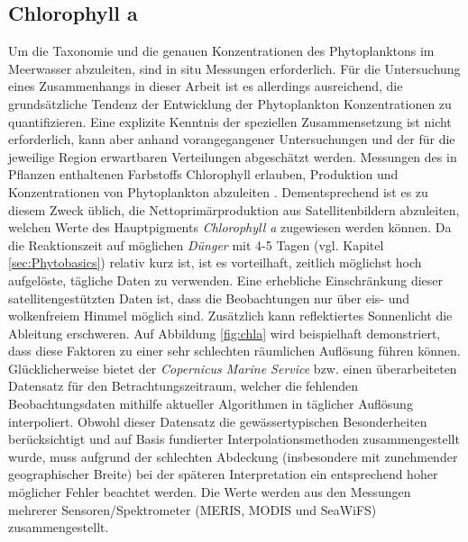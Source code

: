 \documentclass[12pt,a4paper,onecolumn]{scrartcl}
\begin{document}
\subsection{Chlorophyll a} \label{sec:chla}
Um die Taxonomie und die genauen Konzentrationen des Phytoplanktons im Meerwasser abzuleiten, sind in situ Messungen erforderlich. Für die Untersuchung eines Zusammenhangs in dieser Arbeit ist es allerdings ausreichend, die grundsätzliche Tendenz der Entwicklung der Phytoplankton Konzentrationen zu quantifizieren. Eine explizite Kenntnis der speziellen Zusammensetzung ist nicht erforderlich, kann aber anhand vorangegangener Untersuchungen und der für die jeweilige Region erwartbaren Verteilungen abgeschätzt werden. Messungen des in Pflanzen enthaltenen Farbstoffs Chlorophyll erlauben, Produktion und Konzentrationen von Phytoplankton abzuleiten \citep{RYTHER.1957}. Dementsprechend ist es zu diesem Zweck üblich, die Nettoprimärproduktion aus Satellitenbildern abzuleiten, welchen Werte des Hauptpigments \textit{Chlorophyll a} zugewiesen werden können. Da die Reaktionszeit auf möglichen \textit{Dünger} mit 4-5 Tagen (vgl. Kapitel \ref{sec:Phytobasics}) relativ kurz ist, ist es vorteilhaft, zeitlich möglichst hoch aufgelöste, tägliche Daten zu verwenden. Eine erhebliche Einschränkung dieser satellitengestützten Daten ist, dass die Beobachtungen nur über eis- und wolkenfreiem Himmel möglich sind. Zusätzlich kann reflektiertes Sonnenlicht die Ableitung erschweren. Auf Abbildung \ref{fig:chla} wird beispielhaft demonstriert, dass diese Faktoren zu einer sehr schlechten räumlichen Auflösung führen können. Glücklicherweise bietet der \textit{Copernicus Marine Service} bzw. \citet{Saulquin.2019} einen überarbeiteten Datensatz für den Betrachtungszeitraum, welcher die fehlenden Beobachtungsdaten mithilfe aktueller Algorithmen in täglicher Auflösung interpoliert. Obwohl dieser Datensatz die gewässertypischen Besonderheiten berücksichtigt und auf Basis fundierter Interpolationsmethoden zusammengestellt wurde, muss aufgrund der schlechten Abdeckung (insbesondere mit zunehmender geographischer Breite) bei der späteren Interpretation ein entsprechend hoher möglicher Fehler beachtet werden. Die Werte werden  aus den Messungen mehrerer Sensoren/Spektrometer (MERIS, MODIS und SeaWiFS) zusammengestellt.
\end{document}
